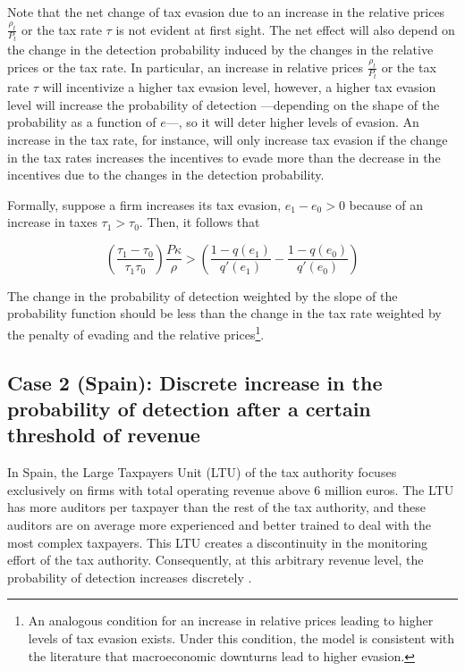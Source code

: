 \documentclass[
  12pt]{article}
\theoremstyle{definition}
\theoremstyle{remark}
\begin{document}
Note that the net change of tax evasion due to an increase in the
relative prices \(\frac{\rho_{t}}{P_t}\) or the tax rate \(\tau\) is not
evident at first sight. The net effect will also depend on the change in
the detection probability induced by the changes in the relative prices
or the tax rate. In particular, an increase in relative prices
\(\frac{\rho_{t}}{P_t}\) or the tax rate \(\tau\) will incentivize a
higher tax evasion level, however, a higher tax evasion level will
increase the probability of detection ---depending on the shape of the
probability as a function of \(e\)---, so it will deter higher levels of
evasion. An increase in the tax rate, for instance, will only increase
tax evasion if the change in the tax rates increases the incentives to
evade more than the decrease in the incentives due to the changes in the
detection probability.

Formally, suppose a firm increases its tax evasion, \(e_1-e_0>0\)
because of an increase in taxes \(\tau_1>\tau_0\). Then, it follows that

\[
\left(\frac{\tau_1-\tau_0}{\tau_1\tau_0}\right)\frac{P\kappa}{\rho}>
  \left(\frac{1-q(e_1)}{q'(e_1)}-\frac{1-q(e_0)}{q'(e_0)}\right)
\]

The change in the probability of detection weighted by the slope of the
probability function should be less than the change in the tax rate
weighted by the penalty of evading and the relative prices\footnote{An
  analogous condition for an increase in relative prices leading to
  higher levels of tax evasion exists. Under this condition, the model
  is consistent with the literature that macroeconomic downturns lead to
  higher evasion.}.

\subsection{Case 2 (Spain): Discrete increase in the probability of
detection after a certain threshold of
revenue}\label{case-2-spain-discrete-increase-in-the-probability-of-detection-after-a-certain-threshold-of-revenue}

In Spain, the Large Taxpayers Unit (LTU) of the tax authority focuses
exclusively on firms with total operating revenue above 6 million euros.
The LTU has more auditors per taxpayer than the rest of the tax
authority, and these auditors are on average more experienced and better
trained to deal with the most complex taxpayers. This LTU creates a
discontinuity in the monitoring effort of the tax authority.
Consequently, at this arbitrary revenue level, the probability of
detection increases discretely \citep{Almunia2018}.
\end{document}
